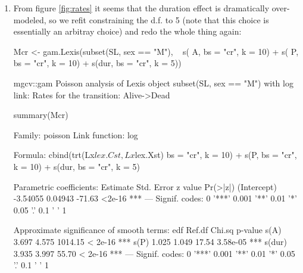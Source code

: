 \begin{enumerate}[resume]

\item From figure \ref{fig:rates} it seems that the duration effect is
dramatically over-modeled, so we refit constraining the d.f. to 5 (note
that this choice is essentially an arbitray choice) and redo the whole
thing again:
\begin{Schunk}
\begin{Sinput}
 Mcr <- gam.Lexis(subset(SL, sex == "M"),
                  ~ s(  A, bs = "cr", k = 10) +
                    s(  P, bs = "cr", k = 10) +
                    s(dur, bs = "cr", k = 5))
\end{Sinput}
\begin{Soutput}
mgcv::gam Poisson analysis of Lexis object subset(SL, sex == "M") with log link:
Rates for the transition:
Alive->Dead
\end{Soutput}
\begin{Sinput}
 summary(Mcr)
\end{Sinput}
\begin{Soutput}
Family: poisson 
Link function: log 

Formula:
cbind(trt(Lx$lex.Cst, Lx$lex.Xst) %in% trnam, Lx$lex.dur) ~ s(A, 
    bs = "cr", k = 10) + s(P, bs = "cr", k = 10) + s(dur, bs = "cr", 
    k = 5)

Parametric coefficients:
            Estimate Std. Error z value Pr(>|z|)    
(Intercept) -3.54055    0.04943  -71.63   <2e-16 ***
---
Signif. codes:  0 '***' 0.001 '**' 0.01 '*' 0.05 '.' 0.1 ' ' 1

Approximate significance of smooth terms:
         edf Ref.df  Chi.sq  p-value    
s(A)   3.697  4.575 1014.15  < 2e-16 ***
s(P)   1.025  1.049   17.54 3.58e-05 ***
s(dur) 3.935  3.997   55.70  < 2e-16 ***
---
Signif. codes:  0 '***' 0.001 '**' 0.01 '*' 0.05 '.' 0.1 ' ' 1


\end{Soutput}
\end{Schunk}
\end{enumerate}
